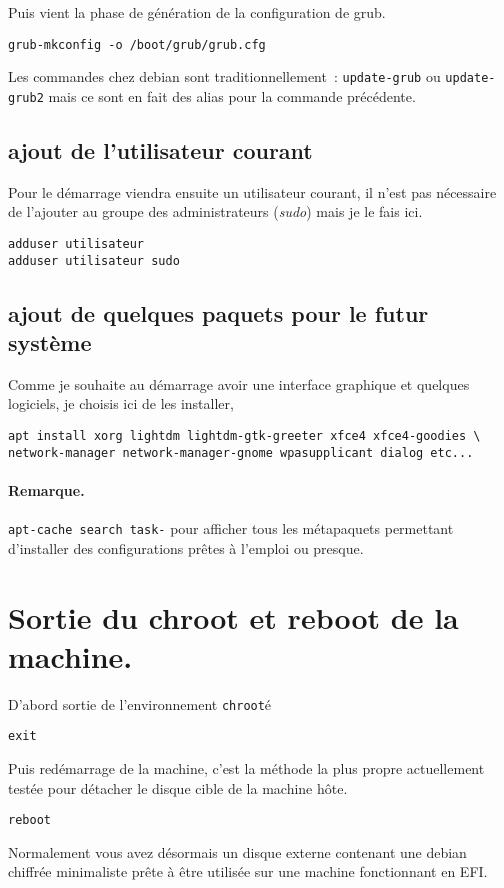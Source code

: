 \documentclass[12pt, a4paper]{article}
\begin{document}
Puis vient la phase de génération de la configuration de grub. 
\begin{verbatim}
grub-mkconfig -o /boot/grub/grub.cfg
\end{verbatim}

Les commandes chez debian sont traditionnellement~: \texttt{update-grub} ou \texttt{update-grub2} mais ce sont en fait des alias pour la commande précédente.

\subsection{ajout de l'utilisateur courant}
Pour le démarrage viendra ensuite un utilisateur courant, il n'est pas nécessaire de l'ajouter au groupe des administrateurs (\emph{sudo\/}) mais je le fais ici.
\begin{verbatim}
adduser utilisateur
adduser utilisateur sudo
\end{verbatim}

\subsection{ajout de quelques paquets pour le futur système}
Comme je souhaite au démarrage avoir une interface graphique et quelques logiciels, je choisis ici de les installer, 
\begin{verbatim}
apt install xorg lightdm lightdm-gtk-greeter xfce4 xfce4-goodies \
network-manager network-manager-gnome wpasupplicant dialog etc...
\end{verbatim}

\paragraph{Remarque.} \texttt{apt-cache search task-} pour afficher tous les métapaquets permettant d'installer des configurations prêtes à l'emploi ou presque.

\section{Sortie du chroot et reboot de la machine.}
D'abord sortie de l'environnement \texttt{chroot}é
\begin{verbatim}
exit
\end{verbatim}

Puis redémarrage de la machine, c'est la méthode la plus propre actuellement testée pour détacher le disque cible de la machine hôte.
\begin{verbatim}
reboot
\end{verbatim}

Normalement vous avez désormais un disque externe contenant une debian chiffrée minimaliste prête à être utilisée sur une machine fonctionnant en EFI.
\end{document}
